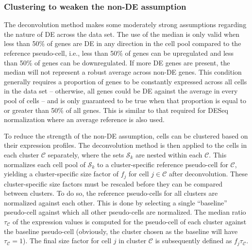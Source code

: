 \documentclass{bmcart}
\newcommand{\revised}[1]{#1}
\begin{document}
\subsubsection*{Clustering to weaken the non-DE assumption}
The deconvolution method makes some moderately strong assumptions regarding the nature of DE across the data set.
The use of the median is only valid when less than 50\% of genes are DE in any direction in the cell pool compared to the reference pseudo-cell,
    i.e., less than 50\% of genes can be upregulated and less than 50\% of genes can be downregulated.
If more DE genes are present, the median will not represent a robust average across non-DE genes.
This condition generally requires a proportion of genes to be constantly expressed across all cells in the data set 
    -- otherwise, all genes could be DE against the average in every pool of cells -- 
    and is only guaranteed to be true when that proportion is equal to or greater than 50\% of all genes.
This is similar to that required for DESeq normalization where an average reference is also used.


To reduce the strength of the non-DE assumption, cells can be clustered based on their expression profiles.
The deconvolution method is then applied to the cells in each cluster $\mathcal{C}$ separately,
    where the sets $\mathcal{S}_k$ are nested within each $\mathcal{C}$.
This normalizes each cell pool of $\mathcal{S}_k$ to a cluster-specific reference pseudo-cell for $\mathcal{C}$,
    yielding a cluster-specific size factor of $f_{j}$ for cell $j \in \mathcal{C}$ after deconvolution.
These cluster-specific size factors must be rescaled before they can be compared between clusters.
To do so, the reference pseudo-cells for all clusters are normalized against each other.
This is done by selecting a single ``baseline'' pseudo-cell against which all other pseudo-cells are normalized.
The median ratio $\tau_{\mathcal{C}}$ of the expression values is computed for the pseudo-cell of each cluster against the baseline pseudo-cell
    (obviously, the cluster chosen as the baseline will have $\tau_{\mathcal{C}}=1$).
The \revised{final} size factor for cell $j$ in cluster $\mathcal{C}$ is subsequently defined as $f_{j}\tau_{\mathcal{C}}$.
\end{document}
